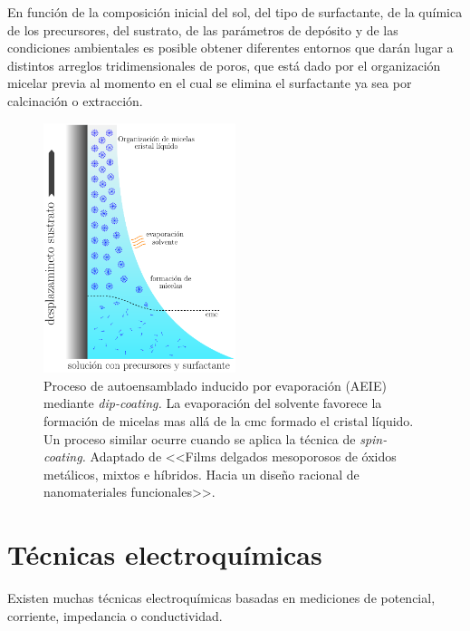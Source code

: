    	 En función de la composición inicial del sol, del tipo de surfactante, de la química de los precursores, del sustrato, de las parámetros de depósito y de las condiciones ambientales es posible obtener diferentes entornos que darán lugar a distintos arreglos tridimensionales de poros, que está dado por el organización micelar previa al momento en el cual se elimina el surfactante ya sea por calcinación o extracción.\cite{Grosso2004,Grosso2002,Crepaldi2002a,Grosso2003,Violi2015} 
		

	 	\begin{figure}[h!]
 				\begin{center}
 				\includegraphics[width=0.5\textwidth]{Esquemas/autoensam.pdf}
 				\caption[Proceso de autoensamblado inducido por evaporación (AEIE)]{Proceso de autoensamblado inducido por evaporación (AEIE) mediante \textit{dip-coating.} La evaporación del solvente favorece la formación de micelas mas allá de la cmc formado el cristal líquido. Un proceso similar ocurre cuando se aplica la técnica de \textit{spin-coating.} Adaptado de <<Films delgados mesoporosos de óxidos metálicos, mixtos e híbridos. Hacia un diseño racional de nanomateriales funcionales>>\cite{Angelome2008}.}
 		   		\label{fig:autoensam}
 		    	\end{center}
 		    	\end{figure}

\section{Técnicas electroquímicas}
					
		Existen muchas técnicas electroquímicas basadas en mediciones de potencial, corriente, impedancia o conductividad.\cite{Wi2000,Bockris1974,koryta1993}

